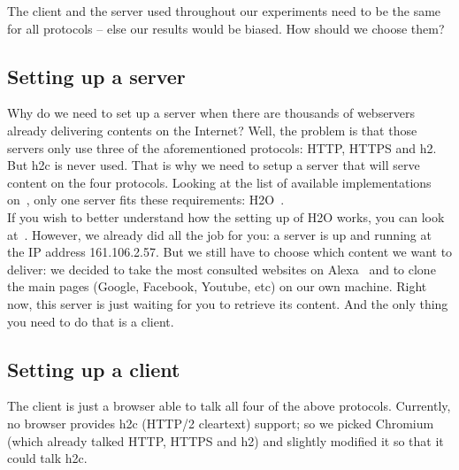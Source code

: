 \documentclass[12pt, notitlepage]{article}
\begin{document}
The client and the server used throughout our experiments need to be the
same for all protocols -- else our results would be biased. How should we
choose them?

\subsection{Setting up a server}

Why do we need to set up a server when there are thousands of webservers
already delivering contents on the Internet? Well, the problem is that
those servers only use three of the aforementioned protocols: HTTP, HTTPS
and h2. But h2c is never used.
That is why we need to setup a server that will serve content on the 
four protocols. 
Looking at the list of available 
implementations on~\cite{implem}, only one server fits these requirements:
H2O~\cite{h2o}.\\

If you wish to better understand how the setting up of H2O works, you
can look at~\cite{h2o}. However, we already did all the job for you: a
server is up and running at the IP address 161.106.2.57.
But we still have to choose which content we want to 
deliver: we decided to take the most consulted websites on
Alexa~\cite{alexa} and to clone the main pages (Google, Facebook, Youtube,
etc) on our own machine.
Right now, this server is just waiting for you to
retrieve its content. And the only thing you need to do that is a client.

\subsection{Setting up a client}

The client is just a browser able to talk all four of the above 
protocols. Currently, no browser provides h2c (HTTP/2 cleartext) support;
so we picked Chromium (which already talked HTTP, HTTPS and h2) and
slightly modified it so that it could talk h2c.\\
\end{document}
